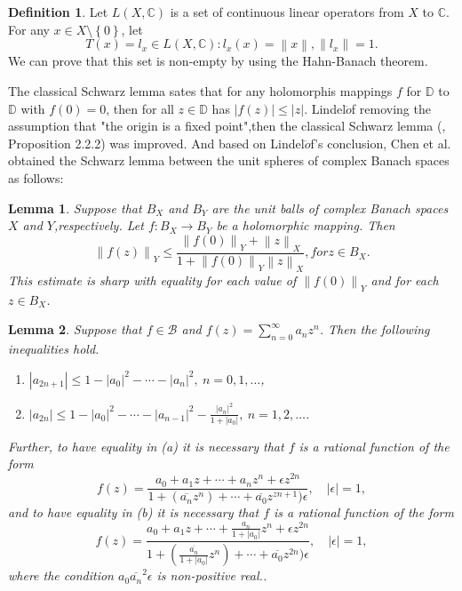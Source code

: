 \documentclass{birkjour}
\theoremstyle{plain}
\newtheorem{lem}{Lemma}
\theoremstyle{definition}
\newtheorem{defn}{Definition}
\theoremstyle{definition}
\begin{document}
\begin{defn}
	Let $L\left ( X,\mathbb{C}  \right ) $ is a set of continuous linear operators from $X$ to $\mathbb{C}$. For any $x\in X\setminus \left \{ 0 \right \} $, let
	\begin{equation*}
		T(x)={l_x \in L\left ( X,\mathbb{C}  \right ):l_x(x)=\left \| x \right \|,\left \| l_x \right \|=1}.
	\end{equation*}
We can prove that this set is non-empty by using the Hahn-Banach theorem.
\end{defn}
The classical Schwarz lemma sates that for any holomorphis mappings $f$ for $\mathbb{D}$ to $\mathbb{D}$ with $f(0)=0$, then for all $z \in \mathbb{D}$ has $\left | f(z) \right | \le \left | z \right | $\cite{ref19}. Lindel$\ddot{o}$f removing the assumption that "the origin is a fixed point",then the classical Schwarz lemma (\cite{ref31}, Proposition 2.2.2) was improved. And based on Lindel$\ddot{o}$f's conclusion, Chen et al.\cite{ref11} obtained the Schwarz lemma between the unit spheres of complex Banach spaces as follows:
\begin{lem}\cite{ref11}
	Suppose that $B_X$ and $B_Y$ are the unit balls of complex Banach spaces $X$ and $Y$,respectively. Let $f:B_X \to B_Y$ be a holomorphic mapping. Then
	\begin{equation}
		\left \| f(z) \right \|_Y \le \frac{\left \| f(0) \right \|_Y+\left \| z \right \|_X }{1+\left \| f(0) \right \|_Y\left \| z \right\|_X }, for z \in B_X.
	\end{equation}
	This estimate is sharp with equality for each value of $\left \| f(0) \right \|_Y$ and for each $z \in B_X$.
\end{lem}
\par
\begin{lem}\cite{ref35}
Suppose that $f \in \mathcal{B}$ and $f(z) = \sum_{n=0}^{\infty} a_n z^n$. Then the following inequalities hold.
\begin{enumerate}
	\item[(a)] $|a_{2n+1}| \leq 1 - |a_0|^2 - \cdots - |a_n|^2,\ n = 0,1,\dots$,
	\item[(b)] $|a_{2n}| \leq 1 - |a_0|^2 - \cdots - |a_{n-1}|^2 - \frac{|a_n|^2}{1+|a_0|},\ n = 1,2,\dots$.
\end{enumerate}
Further, to have equality in (a) it is necessary that $f$ is a rational function of the form
	\begin{equation}
		f(z)=\frac{a_0+a_1z+\cdots +a_nz^n+\epsilon z^{2n}}{1+(\overline{a_n}z^n)+\cdots +\overline{a_0}z^{zn+1})\epsilon } ,\quad  \left| \epsilon \right|=1,
	\end{equation}
	and to have equality in (b) it is necessary that $f$ is a rational function of the form
	\begin{equation}
		f(z)=\frac{a_0+a_1z+\cdots +\frac{a_n}{1+\left | a_0 \right | } z^n+\epsilon z^{2n}}{1+(\frac{\overline{a_n}}{1+\left | a_0 \right | } z^n)+\cdots +\overline{a_0}z^{2n})\epsilon },\quad  \left| \epsilon \right|=1,
	\end{equation}
where the condition $a_0\overline{a_n}^2 \epsilon$ is non-positive real..
\end{lem}
\end{document}
